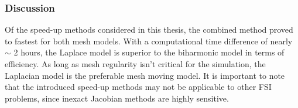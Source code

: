 \subsubsection{Discussion}
Of the speed-up methods considered in this thesis, the combined method proved to fastest for both mesh models. With a computational time difference of nearly $\sim$ 2 hours, the Laplace model is superior to the biharmonic model in terms of efficiency. As long as mesh regularity isn't critical for the simulation, the Laplacian model is the preferable mesh moving model. It is important to note that the introduced speed-up methods may not be applicable to other FSI problems, since inexact Jacobian methods are highly sensitive. 
